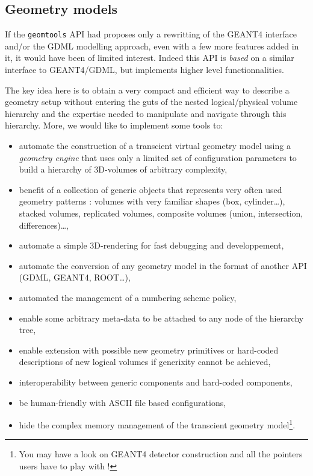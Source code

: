 \subsection{Geometry models}

\pn If the \texttt{geomtools} API had proposes only a rewritting
of the GEANT4 interface and/or the GDML modelling approach, even with a few
more features added in it, it would have been of limited interest.
Indeed this API is \emph{based} on a similar interface to GEANT4/GDML, but
implements higher level functionnalities.

The key  idea here is  to obtain a  very compact and efficient  way to
describe  a geometry  setup without  entering the  guts of  the nested
logical/physical  volume   hierarchy  and  the   expertise  needed  to
manipulate and navigate through this hierarchy. More, we would like to
implement some tools to:
\begin{itemize}

\item automate the construction of a transcient virtual geometry model
  using  a \emph{geometry  engine} that  uses  only a  limited set  of
  configuration  parameters  to  build   a    hierarchy  of
  3D-volumes of arbitrary complexity,

\item benefit of a collection  of generic objects that represents very
  often  used geometry patterns  : volumes  with very  familiar shapes
  (box, cylinder\dots), stacked volumes, replicated volumes, composite
  volumes (union, intersection, differences)\dots,

\item  automate   a  simple   3D-rendering  for  fast   debugging  and
  developpement,

\item automate the  conversion of any geometry model  in the format of
  another API (GDML, GEANT4, ROOT\dots),

\item automated the management of a numbering scheme policy,

\item enable some arbitrary meta-data to be attached to any node
  of the hierarchy tree,

\item  enable  extension  with  possible new  geometry  primitives  or
  hard-coded descriptions of new  logical volumes if generixity cannot
  be achieved,

\item interoperability between generic components and hard-coded components,

\item be human-friendly with ASCII file based configurations,

\item hide  the complex memory  management of the  transcient geometry
  model\footnote{You may  have a look on  GEANT4 detector construction
    and all the pointers users have to play with !}.

\end{itemize}

